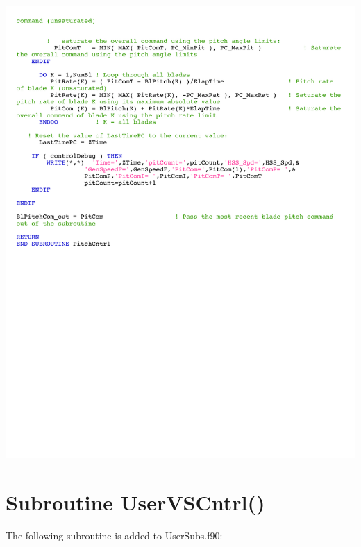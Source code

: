 \noindent
\includegraphics[width=\linewidth]{Figures/AppendixDFigures/figD-1D.pdf}


\section{Subroutine UserVSCntrl()} \label{sectionD-2}
The following subroutine is added to UserSubs.f90:

